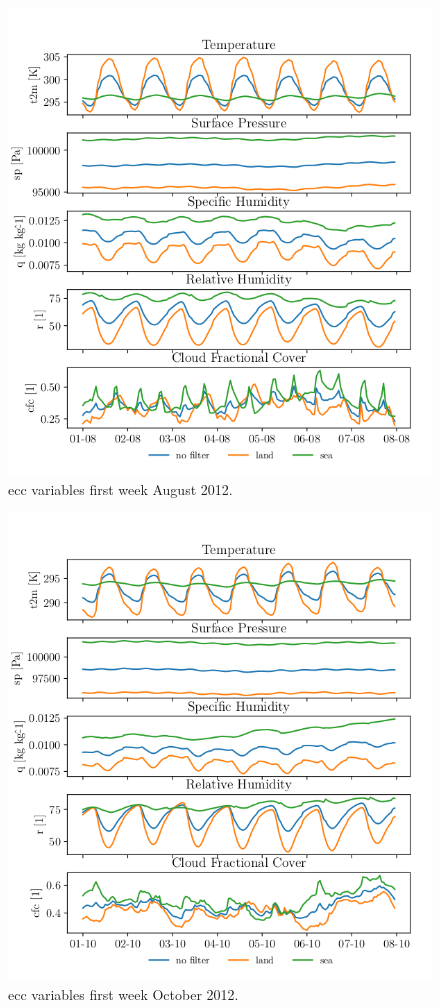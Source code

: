 \begin{figure}[ht]
    \centering
    \includegraphics{python_figs/spatially_averaged_one_week_from_2012-08-01.png}
    \caption{\acrshort{ecc} variables first week August 2012.}
    \label{fig:aug12}
\end{figure}
\begin{figure}[ht]
    \centering
    \includegraphics{python_figs/spatially_averaged_one_week_from_2012-10-01.png}
    \caption{\acrshort{ecc} variables first week October 2012.}
    \label{fig:oct12}
\end{figure}
